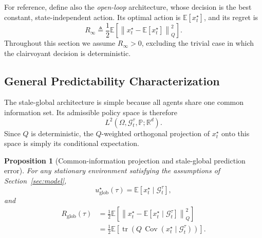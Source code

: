 \documentclass[11pt]{article}
\newtheorem{proposition}{Proposition}
\begin{document}
For reference, define also the \emph{open-loop} architecture, whose decision is
the best constant, state-independent action. Its optimal action is
$\mathbb{E}[x_t^\star]$, and its regret is
\begin{equation}
    R_\infty
    \triangleq
    \frac{1}{2}
    \mathbb{E}
    \left[
        \left\|
            x_t^\star-\mathbb{E}[x_t^\star]
        \right\|_Q^2
    \right].
    \label{eq:Rinf_general}
\end{equation}
Throughout this section we assume $R_\infty>0$, excluding the trivial case in
which the clairvoyant decision is deterministic.

\subsection{General Predictability Characterization}
\label{subsec:general_predictability}

The stale-global architecture is simple because all agents share
one common information set. Its admissible policy space is therefore
\[
    L^2(
        \Omega,\mathcal{G}^{\tau}_t,\mathbb{P};
        \mathbb{R}^{d}
    ).
\]
Since $Q$ is deterministic, the $Q$-weighted orthogonal projection of
$x_t^\star$ onto this space is simply its conditional expectation.

\begin{proposition}[Common-information projection and stale-global prediction error]
\label{prop:general_stale_regret}
For any stationary environment satisfying the assumptions of
Section~\ref{sec:model},
\begin{equation}
    u_{\mathrm{glob}}^\star(\tau)
    =
    \mathbb{E}
    \left[
        x_t^\star
        \mid
        \mathcal{G}^{\tau}_t
    \right],
    \label{eq:global_conditional_policy}
\end{equation}
and
\begin{align}
    R_{\mathrm{glob}}(\tau)
    &=
    \frac{1}{2}
    \mathbb{E}
    \left[
        \left\|
            x_t^\star
            -
            \mathbb{E}
            \left[
                x_t^\star
                \mid
                \mathcal{G}^{\tau}_t
            \right]
        \right\|_Q^2
    \right]
    \label{eq:general_stale_prediction_error}
    \\
    &=
    \frac{1}{2}
    \mathbb{E}
    \left[
        \operatorname{tr}
        \left(
            Q\,
            \operatorname{Cov}
            \left(
                x_t^\star
                \mid
                \mathcal{G}^{\tau}_t
            \right)
        \right)
    \right].
    \label{eq:general_stale_condcov}
\end{align}
\end{proposition}
\end{document}
